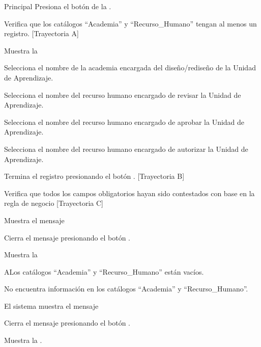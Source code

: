 \begin{UCtrayectoria}{Principal}
    \UCpaso[\UCactor] Presiona el botón  de la .

    \UCpaso Verifica que los catálogos ``Academia'' y ``Recurso\_Humano'' tengan al menos un registro. [Trayectoria A]

    \UCpaso Muestra la 

    \UCpaso[\UCactor] Selecciona el nombre de la academia encargada del diseño/rediseño de la Unidad de Aprendizaje.

    \UCpaso[\UCactor] Selecciona el nombre del recurso humano encargado de revisar la Unidad de Aprendizaje.

    \UCpaso[\UCactor] Selecciona el nombre del recurso humano encargado de aprobar la Unidad de Aprendizaje.

    \UCpaso[\UCactor] Selecciona el nombre del recurso humano encargado de autorizar la Unidad de Aprendizaje.

    \UCpaso[\UCactor] Termina el registro presionando el botón . [Trayectoria B]

    \UCactor Verifica que todos los campos obligatorios hayan sido contestados con base en la regla de negocio  [Trayectoria C]

    \UCpaso Muestra el mensaje 

    \UCpaso[\UCactor] Cierra el mensaje presionando el botón .

    \UCpaso Muestra la 
\end{UCtrayectoria}


\begin{UCtrayectoriaA}{A}{Los catálogos ``Academia'' y ``Recurso\_Humano'' están vacíos.}

    \UCpaso No encuentra información en los catálogos ``Academia'' y ``Recurso\_Humano''.

    \UCpaso El sistema muestra el mensaje 

    \UCpaso[\UCactor] Cierra el mensaje presionando el botón .

    \UCpaso Muestra la .
\end{UCtrayectoriaA}

